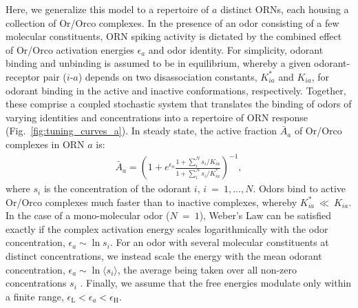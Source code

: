 Here, we generalize this model to a repertoire of $a$ distinct ORNs, each housing a collection of Or/Orco complexes. In the presence of an odor consisting of a few molecular constituents, ORN spiking activity is dictated by the combined effect of Or/Orco activation energies $\epsilon_a$ and  odor identity. For simplicity, odorant binding and unbinding is assumed to be in equilibrium, whereby a given odorant-receptor pair ($i$-$a$) depends on two disassociation constants, $K^*_{ia}$ and $K_{ia}$, for odorant binding in the active and inactive conformations, respectively. Together, these comprise a coupled stochastic system that translates the binding of odors of varying identities and concentrations into a repertoire of ORN response (Fig.~\ref{fig:tuning_curves_a}). In steady state, the active fraction $\bar A_a$ of Or/Orco complexes in ORN $a$ is:
\begin{align}
\bar{A}_a = \left(1 + e^{\epsilon_a}\frac{1 + \sum_i^N s_i/K_{ia}}{1 + \sum_i^N s_i/K^*_{ia}}\right)^{-1},
\label{eq:steady_state_act}
\end{align}
where $s_i$ is the concentration of the odorant $i$, $i~=~1,...,N$. Odors bind to active Or/Orco complexes much faster than to inactive complexes, whereby $K^*_{ia}~\ll~K_{ia}$. In the case of a mono-molecular odor ($N~=~1$), Weber's Law can be satisfied exactly if the complex activation energy scales logarithmically with the odor concentration, $\epsilon_a \sim \ln s_i$. For an odor with several molecular constituents at distinct concentrations, we instead scale the energy with the mean odorant concentration, $\epsilon_a \sim \ln \langle s_i \rangle$, the average being taken over all non-zero concentrations $s_i$ . Finally, we assume that the free energies modulate only within a finite range, $\epsilon_{\text {L}} < \epsilon_a < \epsilon_{\text {H}}$.








